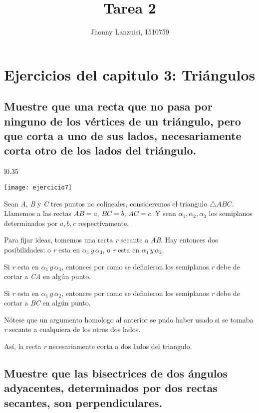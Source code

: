 \documentclass[12pt,a4paper]{article}
\title{Tarea 2}
\author{Jhonny Lanzuisi, 1510759}
\date{}
\begin{document}
	
	\maketitle
	
	\section*{Ejercicios del capitulo 3: Triángulos}
	
		\subsection{Muestre que una recta que no pasa por ninguno de los vértices de un triángulo, pero que corta a uno de sus lados, necesariamente corta otro de los lados del triángulo.}
		
			\begin{wrapfigure}[9]{l}{0.35\textwidth}
				\begin{center}
					\texttt{[image: ejercicio7]}
				\end{center}
			\end{wrapfigure}
			
		Sean \textit{A}, \textit{B} y \textit{C} tres puntos no colineales, consideremos el triangulo \( \triangle ABC \). Llamemos a las rectas \(AB = a\), \(BC = b\), \(AC = c\). Y sean \( \alpha _1, \alpha _2, \alpha _3 \) los semiplanos determinados por \( a,b,c \) respectivamente.
		
		Para fijar ideas, tomemos una recta \textit{r} secante a \textit{AB}. Hay entonces dos posibilidades: o \textit{r} esta en \( \alpha _1 \, y \, \alpha _3 \), o \textit{r} esta en \( \alpha _1 \, y \, \alpha _2 \).
		
		Si \textit{r} esta en \( \alpha _1 \, y \, \alpha _3 \), entonces por como se definieron los semiplanos \textit{r} debe de cortar a \textit{CA} en algún punto.
		
		Si \textit{r} esta en \( \alpha _1 \, y \, \alpha _2 \), entonces por como se definieron los semiplanos \textit{r} debe de cortar a \textit{BC} en algún punto.
		
		Nótese que un argumento homologo al anterior se pudo haber usado si se tomaba \textit{r} secante a cualquiera de los otros dos lados.
		
		Así, la recta \textit{r} necesariamente corta a dos lados del triangulo.
		
		\subsection{Muestre que las bisectrices de dos ángulos adyacentes, determinados por dos rectas secantes, son perpendiculares.}
		
\end{document}
